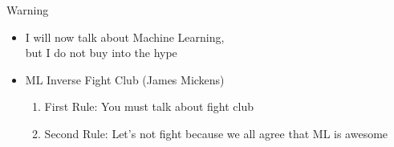 \documentclass[usenames,dvipsnames]{beamer}
\begin{document}
{
%
\begin{frame}[b]{Warning}
\begin{itemize} \Large
	\item \color{white} I will now talk about Machine Learning, \\ but I do not buy into the hype
	\item<2-> ML Inverse Fight Club (James Mickens)
	\begin{enumerate} \color{white} \large
		\item<3-> First Rule: You must talk about fight club
		\item<4-> Second Rule: Let's not fight because we all agree that ML is awesome
	\end{enumerate}
\end{itemize}
\vspace*{2em}
\end{frame}
}
\end{document}
